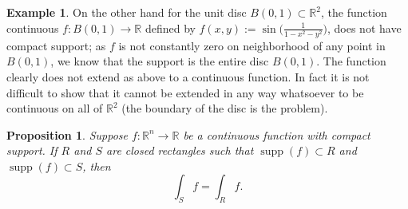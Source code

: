 \documentclass[12pt]{book}
\newcommand{\R}{{\mathbb{R}}}
\theoremstyle{plain}
\newtheorem{prop}[thm]{Proposition}
\theoremstyle{remark}
\theoremstyle{definition}
\theoremstyle{exercise}
\theoremstyle{example}
\newtheorem{example}[thm]{Example}
\begin{document}
\begin{example}
On the other hand for the unit disc $B(0,1) \subset \R^2$,
the function continuous $f \colon B(0,1) \to \R$ defined by $f(x,y) :=
\sin\bigl(\frac{1}{1-x^2-y^2}\bigr)$, does not have compact support; as
$f$ is not constantly zero on neighborhood of any point in $B(0,1)$,
we know that the support is the entire disc $B(0,1)$.  The function clearly
does not extend as above to a continuous function.  In fact it is not
difficult to show that it cannot be extended in any way whatsoever to be
continuous on all of $\R^2$ (the boundary of the disc is the problem).
\end{example}

\begin{prop} \label{mv:prop:rectanglessupp}
Suppose $f \colon \R^n \to \R$ be a continuous function with compact support.
If $R$ and $S$ are closed rectangles such that
$\operatorname{supp}(f) \subset R$
and
$\operatorname{supp}(f) \subset S$, then
\begin{equation*}
\int_S f = \int_R f .
\end{equation*}
\end{prop}
\end{document}
